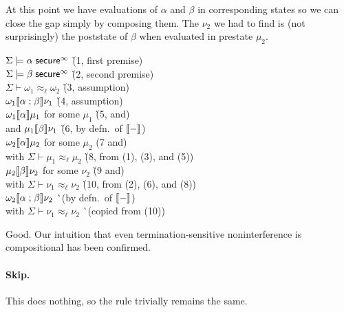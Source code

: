 \documentclass[11pt]{article}
\begin{document}
At this point we have evaluations of $\alpha$ and $\beta$ in corresponding
states so we can close the gap simply by composing them.  The $\nu_2$ we
had to find is (not surprisingly) the poststate of $\beta$ when evaluated
in prestate $\mu_2$.
\begin{tabbing}
  $\Sigma \models \alpha\; \mathsf{secure}^\infty$ \` (1, first premise) \\
  $\Sigma \models \beta\; \mathsf{secure}^\infty$ \` (2, second premise) \\
  $\Sigma \vdash \omega_1 \approx_\ell \omega_2$ \` (3, assumption) \\
  $\omega_1 \llbracket \alpha \mathrel{;} \beta \rrbracket \nu_1$ \` (4, assumption) \\
  $\omega_1 \llbracket \alpha \rrbracket \mu_1$ for some $\mu_1$ \` (5, and) \\
  and $\mu_1 \llbracket \beta \rrbracket \nu_1$ \` (6, by defn.\ of $\llbracket{-}\rrbracket$) \\
  $\omega_2 \llbracket \alpha \rrbracket \mu_2$ for some $\mu_2$ (7 and) \\
  with $\Sigma \vdash \mu_1 \approx_\ell \mu_2$ \` (8, from (1), (3), and (5)) \\
  $\mu_2 \llbracket \beta \rrbracket \nu_2$ for some $\nu_2$ \` (9 and) \\
  with $\Sigma \vdash \nu_1 \approx_\ell \nu_2$ \` (10, from (2), (6), and (8)) \\
  $\omega_2 \llbracket \alpha \mathrel{;} \beta \rrbracket \nu_2$ \` \color{blue}(by defn.\ of $\llbracket{-}\rrbracket$) \\
  with $\Sigma \vdash \nu_1 \approx_\ell \nu_2$ \` \color{blue}(copied from (10))
\end{tabbing}
Good.  Our intuition that even termination-sensitive noninterference
is compositional has been confirmed.

\paragraph{Skip.}  This does nothing, so the rule trivially remains
the same.
\begin{rules}
  {\mathstrut}
\end{rules}
\end{document}
